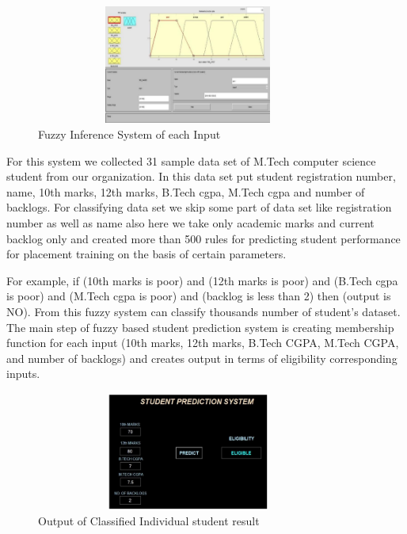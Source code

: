 \documentclass[12pt]{article}
\begin{document}
\begin{figure}[H]
\begin{center}
 \includegraphics[width=10cm, height=3.9cm]{L3P1}
\caption{Fuzzy Inference System of each Input}
\end{center}
\end{figure}

For this system we collected 31 sample data set of M.Tech 
computer science student from our organization. In this data set 
put student registration number, name, 10th marks, 12th marks, 
B.Tech cgpa, M.Tech cgpa and number of backlogs. For 
classifying data set we skip some part of data set like registration 
number as well as name also here we take only academic marks 
and current backlog only and created more than 500 rules for 
predicting student performance for placement training on the 
basis of certain parameters. 

For example, if (10th marks is poor) 
and (12th marks is poor) and (B.Tech cgpa is poor) and (M.Tech 
cgpa is poor) and (backlog is less than 2) then (output is NO). 
From this fuzzy system can classify thousands number of 
student’s dataset. 
The main step of fuzzy based student prediction system is 
creating membership function for each input (10th marks, 12th
marks, B.Tech CGPA, M.Tech CGPA, and number of backlogs) 
and creates output in terms of eligibility corresponding inputs.

\begin{figure}[H]
\begin{center}
 \includegraphics[width=10cm, height=3.9cm]{L3P2}
\caption{Output of Classified Individual student result}
\end{center}
\end{figure}
\end{document}
